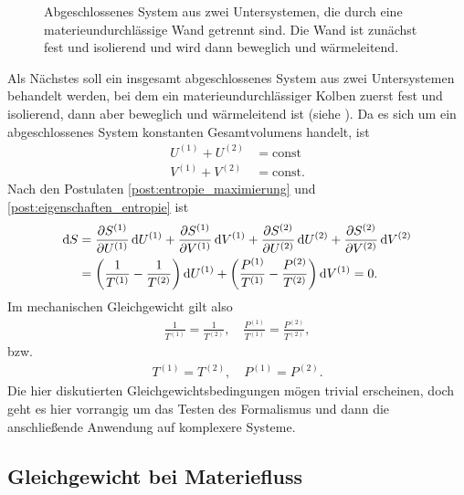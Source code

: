 \begin{figure}[htbp]
    \centering
    \tfigDoppelsystemUVNbeweglicheWaermeleitendeWand
    \caption{Abgeschlossenes System aus zwei Untersystemen, die durch eine materieundurchlässige Wand getrennt sind. Die Wand ist zunächst fest und isolierend und wird dann beweglich und wärmeleitend.}
    \label{fig:DoppelsystemUVNbeweglicheWaermeleitendeWand}
\end{figure}


Als Nächstes soll ein insgesamt abgeschlossenes System aus zwei Untersystemen behandelt werden, bei dem ein materieundurchlässiger Kolben zuerst fest und isolierend, dann aber beweglich und wärmeleitend ist (siehe ). Da es sich um ein abgeschlossenes System konstanten Gesamtvolumens handelt, ist
\begin{align*}
    U^{(1)} + U^{(2)} & = \mathrm{const}  \\
    V^{(1)} + V^{(2)} & = \mathrm{const}.
\end{align*}
Nach den Postulaten \ref{post:entropie_maximierung} und \ref{post:eigenschaften_entropie} ist
\begin{align*}
    \mathop{}\!\mathrm{d} S & = \frac{\partial S^{(1)}}{\partial U^{(1)}}\mathop{}\!\mathrm{d} U^{(1)} + \frac{\partial S^{(1)}}{\partial V^{(1)}}\mathop{}\!\mathrm{d} V^{(1)}+\frac{\partial S^{(2)}}{\partial U^{(2)}}\mathop{}\!\mathrm{d} U^{(2)} + \frac{\partial S^{(2)}}{\partial V^{(2)}}\mathop{}\!\mathrm{d} V^{(2)} \\
            & = \left(\frac{1}{T^{(1)}}-\frac{1}{T^{(2)}}\right)\mathop{}\!\mathrm{d} U^{(1)} + \left(\frac{P^{(1)}}{T^{(1)}}-\frac{P^{(2)}}{T^{(2)}}\right) \mathop{}\!\mathrm{d} V^{(1)} = 0.
\end{align*}
Im mechanischen Gleichgewicht gilt also
\begin{align*}
    \frac{1}{T^{(1)}} = \frac{1}{T^{(2)}} , \quad \frac{P^{(1)}}{T^{(1)}}=\frac{P^{(2)}}{T^{(2)}},
\end{align*}
bzw.
\begin{align*}
    T^{(1)} = T^{(2)}, \quad P^{(1)} = P^{(2)}.
\end{align*}
Die hier diskutierten Gleichgewichtsbedingungen mögen trivial erscheinen, doch geht es hier vorrangig um das Testen des Formalismus und dann die anschließende Anwendung auf komplexere Systeme.


\subsection{Gleichgewicht bei Materiefluss\label{sec:gleichgewicht_bei_materiefluss}}

